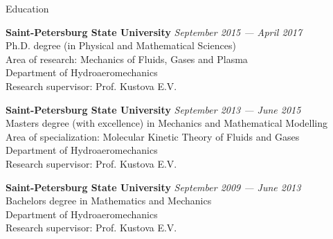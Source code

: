 \documentclass{resume} %
\begin{document}

\begin{rSection}{Education}

{\bf Saint-Petersburg State University} \hfill {\em September 2015 --- April 2017} \\ 
Ph.D. degree (in Physical and Mathematical Sciences)\\
Area of research: Mechanics of Fluids, Gases and Plasma \\
Department of Hydroaeromechanics \smallskip \\
Research supervisor: Prof. Kustova E.V.

{\bf Saint-Petersburg State University} \hfill {\em September 2013 --- June 2015} \\ 
Masters degree (with excellence) in Mechanics and Mathematical Modelling\\
Area of specialization: Molecular Kinetic Theory of Fluids and Gases\\
Department of Hydroaeromechanics \smallskip \\
Research supervisor: Prof. Kustova E.V.

{\bf Saint-Petersburg State University} \hfill {\em September 2009 --- June 2013} \\ 
Bachelors degree in Mathematics and Mechanics \\
Department of Hydroaeromechanics \smallskip \\
Research supervisor: Prof. Kustova E.V.
\end{rSection}

\end{document}
